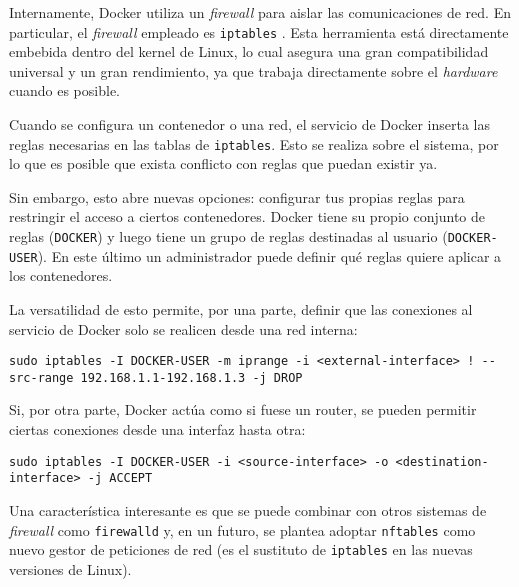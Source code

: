 Internamente, Docker utiliza un \textit{firewall} para aislar las comunicaciones
de red. En particular, el \textit{firewall} empleado es \texttt{iptables} \autocite{DockerIptables2021}.
Esta herramienta está directamente embebida dentro del kernel de Linux, lo
cual asegura una gran compatibilidad universal y un gran rendimiento, ya que
trabaja directamente sobre el \textit{hardware} cuando es posible.

Cuando se configura un contenedor o una red, el servicio de Docker inserta
las reglas necesarias en las tablas de \texttt{iptables}. Esto se realiza
sobre el sistema, por lo que es posible que exista conflicto con reglas que
puedan existir ya.

Sin embargo, esto abre nuevas opciones: configurar tus propias reglas para
restringir el acceso a ciertos contenedores. Docker tiene su propio conjunto 
de reglas (\texttt{DOCKER}) y luego tiene un grupo de reglas destinadas al
usuario (\texttt{DOCKER-USER}). En este último un administrador puede definir
qué reglas quiere aplicar a los contenedores.

La versatilidad de esto permite, por una parte, definir que las conexiones
al servicio de Docker solo se realicen desde una red interna:

\begin{lstlisting}[style=bash, caption={Restricción de las conexiones a Docker según un rango de IPs \autocite{DockerIptables2021}.}]
sudo iptables -I DOCKER-USER -m iprange -i <external-interface> ! --src-range 192.168.1.1-192.168.1.3 -j DROP
\end{lstlisting}

Si, por otra parte, Docker actúa como si fuese un router, se pueden permitir ciertas
conexiones desde una interfaz hasta otra:

\begin{lstlisting}[style=bash, caption={}]
sudo iptables -I DOCKER-USER -i <source-interface> -o <destination-interface> -j ACCEPT
\end{lstlisting}

Una característica interesante es que se puede combinar con otros sistemas de
\textit{firewall} como \texttt{firewalld} y, en un futuro, se plantea adoptar
\texttt{nftables} como nuevo gestor de peticiones de red (es el sustituto de 
\texttt{iptables} en las nuevas versiones de Linux).